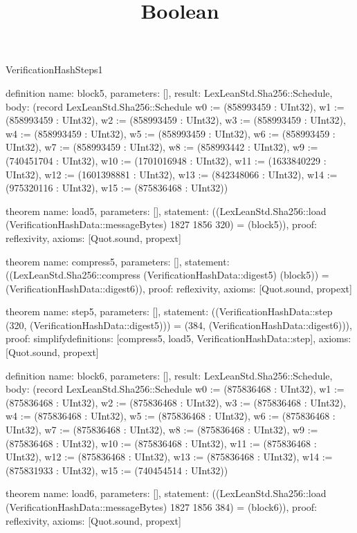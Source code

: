 \begin{lexlean}{VerificationHashSteps1}
\title{Boolean}
\begin{semanticmodule}

definition{
  name: block5,
  parameters: [],
  result: LexLeanStd.Sha256::Schedule,
  body: (record LexLeanStd.Sha256::Schedule {w0 := (858993459 : UInt32), w1 := (858993459 : UInt32), w2 := (858993459 : UInt32), w3 := (858993459 : UInt32), w4 := (858993459 : UInt32), w5 := (858993459 : UInt32), w6 := (858993459 : UInt32), w7 := (858993459 : UInt32), w8 := (858993442 : UInt32), w9 := (740451704 : UInt32), w10 := (1701016948 : UInt32), w11 := (1633840229 : UInt32), w12 := (1601398881 : UInt32), w13 := (842348066 : UInt32), w14 := (975320116 : UInt32), w15 := (875836468 : UInt32)})
}

theorem{
  name: load5,
  parameters: [],
  statement: ((LexLeanStd.Sha256::load (VerificationHashData::messageBytes) 1827 1856 320) = (block5)),
  proof: reflexivity{},
  axioms: [Quot.sound, propext]
}

theorem{
  name: compress5,
  parameters: [],
  statement: ((LexLeanStd.Sha256::compress (VerificationHashData::digest5) (block5)) = (VerificationHashData::digest6)),
  proof: reflexivity{},
  axioms: [Quot.sound, propext]
}

theorem{
  name: step5,
  parameters: [],
  statement: ((VerificationHashData::step (320, (VerificationHashData::digest5))) = (384, (VerificationHashData::digest6))),
  proof: simplify{definitions: [compress5, load5, VerificationHashData::step]},
  axioms: [Quot.sound, propext]
}

definition{
  name: block6,
  parameters: [],
  result: LexLeanStd.Sha256::Schedule,
  body: (record LexLeanStd.Sha256::Schedule {w0 := (875836468 : UInt32), w1 := (875836468 : UInt32), w2 := (875836468 : UInt32), w3 := (875836468 : UInt32), w4 := (875836468 : UInt32), w5 := (875836468 : UInt32), w6 := (875836468 : UInt32), w7 := (875836468 : UInt32), w8 := (875836468 : UInt32), w9 := (875836468 : UInt32), w10 := (875836468 : UInt32), w11 := (875836468 : UInt32), w12 := (875836468 : UInt32), w13 := (875836468 : UInt32), w14 := (875831933 : UInt32), w15 := (740454514 : UInt32)})
}

theorem{
  name: load6,
  parameters: [],
  statement: ((LexLeanStd.Sha256::load (VerificationHashData::messageBytes) 1827 1856 384) = (block6)),
  proof: reflexivity{},
  axioms: [Quot.sound, propext]
}


\end{semanticmodule}
\end{lexlean}
